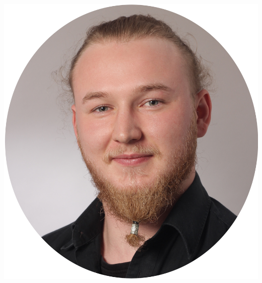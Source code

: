 \documentclass[
    10pt, %
]{FreemanCV}
\begin{document}
\begin{paracol}{2}
        \switchcolumn
        \includegraphics[scale=0.1]{assets/Bewerbungsfoto}
        


\end{paracol}
\end{document}
